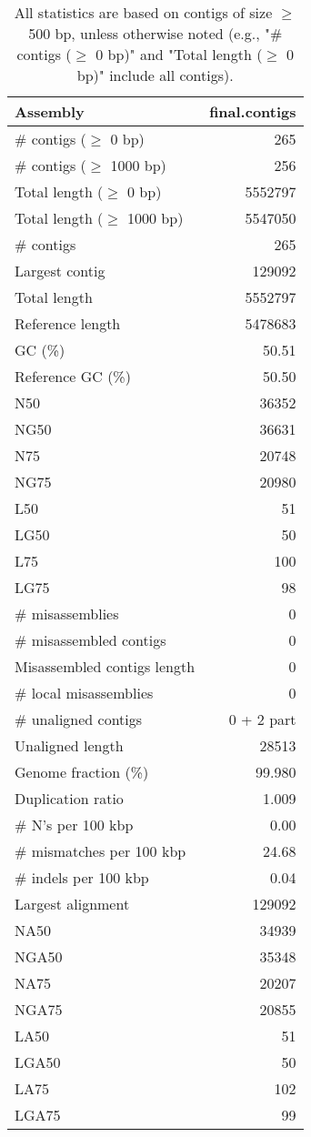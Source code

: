 \documentclass[12pt,a4paper]{article}
\begin{document}
\begin{table}[ht]
\begin{center}
\caption{All statistics are based on contigs of size $\geq$ 500 bp, unless otherwise noted (e.g., "\# contigs ($\geq$ 0 bp)" and "Total length ($\geq$ 0 bp)" include all contigs).}
\begin{tabular}{|l*{1}{|r}|}
\hline
Assembly & final.contigs \\ \hline
\# contigs ($\geq$ 0 bp) & 265 \\ \hline
\# contigs ($\geq$ 1000 bp) & 256 \\ \hline
Total length ($\geq$ 0 bp) & 5552797 \\ \hline
Total length ($\geq$ 1000 bp) & 5547050 \\ \hline
\# contigs & 265 \\ \hline
Largest contig & 129092 \\ \hline
Total length & 5552797 \\ \hline
Reference length & 5478683 \\ \hline
GC (\%) & 50.51 \\ \hline
Reference GC (\%) & 50.50 \\ \hline
N50 & 36352 \\ \hline
NG50 & 36631 \\ \hline
N75 & 20748 \\ \hline
NG75 & 20980 \\ \hline
L50 & 51 \\ \hline
LG50 & 50 \\ \hline
L75 & 100 \\ \hline
LG75 & 98 \\ \hline
\# misassemblies & 0 \\ \hline
\# misassembled contigs & 0 \\ \hline
Misassembled contigs length & 0 \\ \hline
\# local misassemblies & 0 \\ \hline
\# unaligned contigs & 0 + 2 part \\ \hline
Unaligned length & 28513 \\ \hline
Genome fraction (\%) & 99.980 \\ \hline
Duplication ratio & 1.009 \\ \hline
\# N's per 100 kbp & 0.00 \\ \hline
\# mismatches per 100 kbp & 24.68 \\ \hline
\# indels per 100 kbp & 0.04 \\ \hline
Largest alignment & 129092 \\ \hline
NA50 & 34939 \\ \hline
NGA50 & 35348 \\ \hline
NA75 & 20207 \\ \hline
NGA75 & 20855 \\ \hline
LA50 & 51 \\ \hline
LGA50 & 50 \\ \hline
LA75 & 102 \\ \hline
LGA75 & 99 \\ \hline
\end{tabular}
\end{center}
\end{table}
\end{document}
